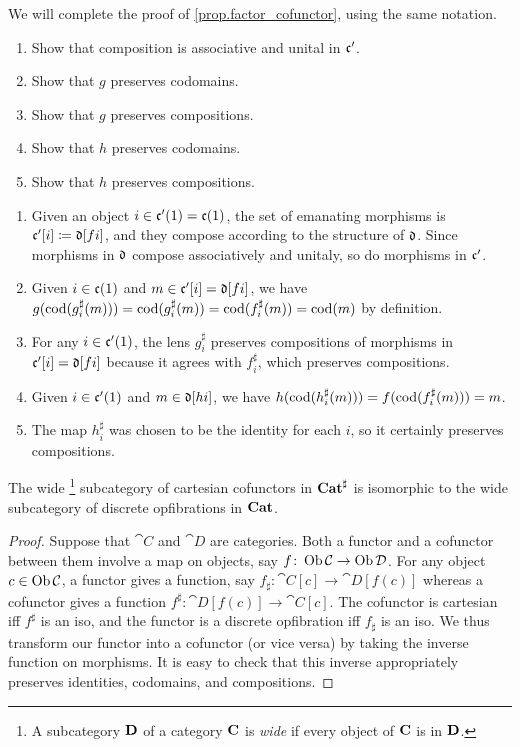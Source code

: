 \documentclass[Book-Poly]{subfiles}
\begin{document}
\begin{exercise}\label{exc.factor_cofunctor}
We will complete the proof of \cref{prop.factor_cofunctor}, using the same notation.
\begin{enumerate}
	\item Show that composition is associative and unital in $\mathfrak{c'}$.
	\item Show that $g$ preserves codomains.
	\item Show that $g$ preserves compositions.
	\item Show that $h$ preserves codomains.
	\item Show that $h$ preserves compositions.
\qedhere
\end{enumerate}
\begin{solution}
\begin{enumerate}
    \item Given an object $i\in\mathfrak{c'}(1)=\mathfrak{c}(1)$, the set of emanating morphisms is $\mathfrak{c'}[i]\coloneqq\mathfrak{d}[fi]$, and they compose according to the structure of $\mathfrak{d}$. Since morphisms in $\mathfrak{d}$ compose associatively and unitaly, so do morphisms in $\mathfrak{c'}$.
    \item Given $i\in\mathfrak{c}(1)$ and $m\in \mathfrak{c'}[i]=\mathfrak{d}[fi]$, we have $g(\operatorname{cod}(g^\sharp_i(m)))=\operatorname{cod}(g^\sharp_i(m))=\operatorname{cod}(f^\sharp_i(m))=\operatorname{cod}(m)$ by definition.
    \item For any $i\in\mathfrak{c'}(1)$, the lens $g^\sharp_i$ preserves compositions of morphisms in $\mathfrak{c'}[i]=\mathfrak{d}[fi]$ because it agrees with $f^\sharp_i$, which preserves compositions.
    \item Given $i\in\mathfrak{c'}(1)$ and $m\in\mathfrak{d}[hi]$, we have $h(\operatorname{cod}(h^\sharp_i(m)))=f(\operatorname{cod}(f^\sharp_i(m)))=m$.
    \item The map $h^\sharp_i$ was chosen to be the identity for each $i$, so it certainly preserves compositions.
\end{enumerate}
\end{solution}
\end{exercise}

\begin{proposition} \label{prop.cart_dopf}
The wide%
\footnote{A subcategory $\mathbf{D}$ of a category $\mathbf{C}$ is \emph{wide} if every object of $\mathbf{C}$ is in $\mathbf{D}$.}%
subcategory of cartesian cofunctors in $\mathbf{Cat}^\sharp$ is isomorphic to the wide subcategory of discrete opfibrations in $\mathbf{Cat}$.
\end{proposition}
\begin{proof}
Suppose that $\cat{C}$ and $\cat{D}$ are categories. Both a functor and a cofunctor between them involve a map on objects, say $f\colon\operatorname{Ob}\mathcal{C}\to\operatorname{Ob}\mathcal{D}$. For any object $c\in\operatorname{Ob}\mathcal{C}$, a functor gives a function, say $f_\sharp\colon\cat{C}[c]\to\cat{D}[f(c)]$ whereas a cofunctor gives a function $f^\sharp\colon\cat{D}[f(c)]\to\cat{C}[c]$. The cofunctor is cartesian iff $f^\sharp$ is an iso, and the functor is a discrete opfibration iff $f_\sharp$ is an iso. We thus transform our functor into a cofunctor (or vice versa) by taking the inverse function on morphisms. It is easy to check that this inverse appropriately preserves identities, codomains, and compositions.
\end{proof}
\end{document}
